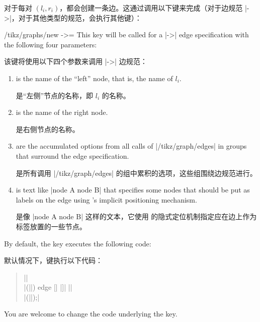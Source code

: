 \begin{enumerate}
        
        对于每对 $(l_i,r_i)$，都会创建一条边。这通过调用以下键来完成（对于边规范 |->|，对于其他类型的规范，会执行其他键）：

%
        \begin{key}{/tikz/graphs/new ->=}
            This key will be called for a |->| edge specification with the
            following four parameters:
            
            该键将使用以下四个参数来调用 |->| 边规范：

%
            \begin{enumerate}
                \item {} is the name of the ``left'' node, that
                    is, the name of $l_i$.

                     是``左侧''节点的名称，即 $l_i$ 的名称。


                \item {} is the name of the right node.

                 是右侧节点的名称。


                \item {} are the accumulated options from all
                    calls of |/tikz/graph/edges| in groups that surround the
                    edge specification.

                     是所有调用 |/tikz/graph/edges| 的组中累积的选项，这些组围绕边规范进行。


                \item {} is text like |node {A} node {B}| that
                    specifies some nodes that should be put as labels on the
                    edge using \tikzname's implicit positioning mechanism.

                     是像 |node {A} node {B}| 这样的文本，它使用 \tikzname 的隐式定位机制指定应在边上作为标签放置的一些节点。
            \end{enumerate}
            By default, the key executes the following code:
            
            默认情况下，键执行以下代码：

%
            \begin{quote}
                ||\\
                \hbox{}\quad|(||\tikzgraphleftanchor) edge [|%
                |]| ||\\
                \hbox{}\quad|(||\tikzgraphrightanchor);|
            \end{quote}
            You are welcome to change the code underlying the key.
            

\end{key}
\end{enumerate}
